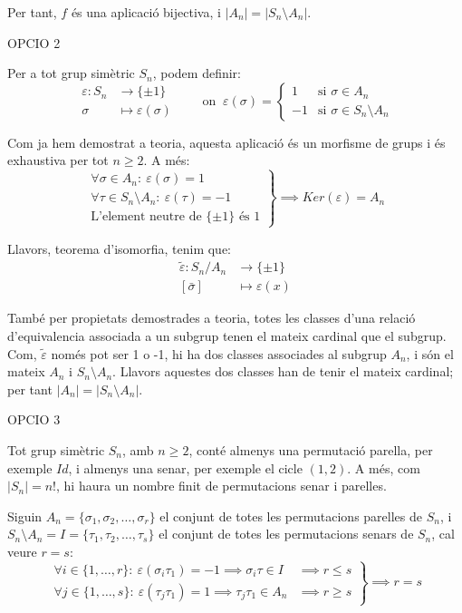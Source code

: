 \documentclass[a4paper, 11pt]{article}
\newcommand{\tq}{:\ }
\begin{document}
\begin{enumerate}
		Per tant, $f$ és una aplicació bijectiva, i $|A_n| = |S_n \setminus A_n|$.

		OPCIO 2
		
		Per a tot grup simètric $S_n$, podem definir:
		\[\begin{aligned}
			\varepsilon: S_n & \longrightarrow \{\pm 1\} \\
			\sigma & \longmapsto \varepsilon (\sigma)
		\end{aligned} \qquad \text{on } \: \varepsilon (\sigma) = \left\{\begin{array}{rl}
			1 & \text{si } \sigma \in A_n \\
			-1 & \text{si } \sigma \in S_n \setminus A_n
		\end{array}\right.\]

		Com ja hem demostrat a teoria, aquesta aplicació és un morfisme de grups i és exhaustiva per tot $n \geq 2$. A més:
		\[\left.\begin{array}{l}
			\forall \sigma \in A_n \tq \varepsilon (\sigma) = 1 \\
			\forall \tau \in S_n \setminus A_n \tq \varepsilon (\tau) = -1\\
			\text{L'element neutre de } \{\pm 1\} \text{ és } 1
		\end{array}\right\} \implies Ker(\varepsilon) = A_n\]
		
		Llavors, teorema d'isomorfia, tenim que:
		\[\begin{aligned}
			\tilde{\varepsilon}: S_n \big/ A_n & \longrightarrow \{\pm 1\} \\
			[\bar{\sigma}] & \longmapsto \varepsilon (x)
		\end{aligned}\]

		També per propietats demostrades a teoria, totes les classes d'una relació d'equivalencia associada a un subgrup tenen el mateix cardinal que el subgrup. Com, $\tilde{\varepsilon}$ només pot ser 1 o -1, hi ha dos classes associades al subgrup $A_n$, i són el mateix $A_n$ i $S_n \setminus A_n$. Llavors aquestes dos classes han de tenir el mateix cardinal; per tant $|A_n| = |S_n \setminus A_n|$.

		OPCIO 3
		
		Tot grup simètric $S_n$, amb $n \geq 2$, conté almenys una permutació parella, per exemple $Id$, i almenys una senar, per exemple el cicle $(1, 2)$. A més, com $|S_n| = n!$, hi haura un nombre finit de permutacions senar i parelles.
		
		Siguin $A_n = \{\sigma_1, \sigma_2, \dotsc , \sigma_r\}$ el conjunt de totes les permutacions parelles de $S_n$, i $S_n \setminus A_n = I = \{\tau_1, \tau_2, \dotsc , \tau_s\}$ el conjunt de totes les permutacions senars de $S_n$, cal veure $r = s$:
		\[\left.\begin{aligned}
			\forall i \in \{1, \dotsc, r\} \tq \varepsilon (\sigma_i\tau_1) = -1 \implies \sigma_i\tau \in I & \implies r \leq s \\
			\forall j \in \{1, \dotsc, s\} \tq \varepsilon (\tau_j\tau_1) = 1 \implies \tau_j\tau_1 \in A_n & \implies r \geq s
		\end{aligned}\right\} \implies r = s\]


\end{enumerate}
\end{document}
